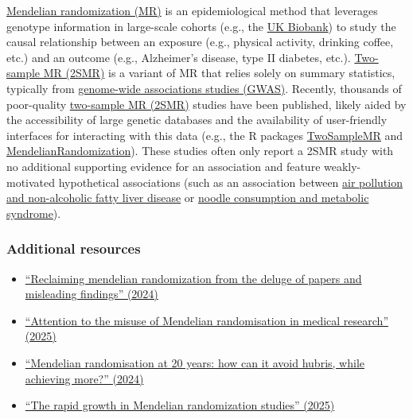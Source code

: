 \documentclass[letterpaper, 12pt]{article}
\begin{document}
\href{https://doi.org/10.1038/s43586-021-00092-5}{Mendelian randomization (MR)} is an epidemiological method that leverages genotype information in large-scale cohorts (e.g., the \href{https://www.ukbiobank.ac.uk/}{UK Biobank}) to study the causal relationship between an exposure (e.g., physical activity, drinking coffee, etc.) and an outcome (e.g., Alzheimer's disease, type II diabetes, etc.). \href{https://doi.org/10.1093/ije/dyx028}{Two-sample MR (2SMR)} is a variant of MR that relies solely on summary statistics, typically from \href{https://doi.org/10.1038/s43586-021-00056-9}{genome-wide associations studies (GWAS)}. Recently, thousands of poor-quality \href{https://doi.org/10.1093/ije/dyx028}{two-sample MR (2SMR)} studies have been published, likely aided by the accessibility of large genetic databases and the availability of user-friendly interfaces for interacting with this data (e.g., the R packages \href{https://doi.org/10.7554/eLife.34408}{TwoSampleMR} and \href{https://doi.org/10.12688/wellcomeopenres.19995.2}{MendelianRandomization}). These studies often only report a 2SMR study with no additional supporting evidence for an association and feature weakly-motivated hypothetical associations (such as an association between \href{http://dx.doi.org/10.3389/fendo.2024.1396032}{air pollution and non-alcoholic fatty liver disease} or \href{http://dx.doi.org/10.3390/nu15092091}{noodle consumption and metabolic syndrome}).

\subsubsection*{Additional resources}

\begin{itemize}
    \setlength\itemsep{-0.5em}
    \item \href{https://doi.org/10.1186/s12944-024-02284-w}{``Reclaiming mendelian randomization from the deluge of papers and misleading findings'' (2024)}
    \item \href{https://doi.org/10.1136/egastro-2025-100187}{``Attention to the misuse of Mendelian randomisation in medical research'' (2025)}
    \item \href{https://doi.org/10.1016/S2213-8587(23)00348-0}{``Mendelian randomisation at 20 years: how can it avoid hubris, while achieving more?'' (2024)}
    \item \href{https://doi.org/10.1007/s10654-025-01317-7}{``The rapid growth in Mendelian randomization studies'' (2025)}
\end{itemize}
\end{document}
